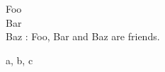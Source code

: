 \documentclass[a4paper,10pt]{article}
\begin{document}
\begin{description}
    \item{Foo\\ Bar \\ Baz }
        : Foo, Bar and Baz are friends.
    \item a, b, c
\end{description}
\end{document}
